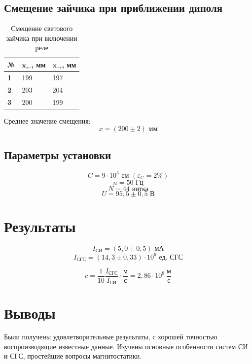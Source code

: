 \documentclass[a4paper, 12pt]{article}
\begin{document}
\subsection*{Смещение зайчика при приближении диполя}

\begin{table}[H]
\centering
\begin{tabular}{|l|l|l|}
\hline
\textbf{№}          & \textbf{$\mathbf{x_\leftarrow}$, мм} & \textbf{$\mathbf{x_\rightarrow}$, мм} \\ \hline
\textbf{1} & 199                         & 197                          \\ \hline
\textbf{2} & 203                         & 204                          \\ \hline
\textbf{3} & 200                         & 199                          \\ \hline
\end{tabular}
\caption{Смещение светового зайчика при включении реле}
\end{table}

Среднее значение смещения:
$$x = (200\pm2) \text{ мм}$$
\subsection*{Параметры установки}
$$C=9\cdot 10^5 \text{ см } (\varepsilon_C = 2\%)$$
$$n = 50 \text{ Гц}$$
$$N = 44 \text{ витка}$$
$$U=95,5\pm 0,5 \text{ В}$$

\section*{Результаты}
$$I_\text{СИ} = (5,0\pm0,5) \text{ мА}$$
$$I_\text{СГС}= (14,3\pm0,33)\cdot10^{6} \text{ ед. СГС}$$

$$c=\frac{1}{10}\frac{I_\text{СГС}}{I_\text{СИ}}\cdot\frac{\text{м}}{\text{с}} = 2,86\cdot 10^8\ \frac{\text{м}}{\text{с}}$$

\section*{Выводы}
Были получены удовлетворительные результаты, с хорошей точностью воспроизводящие известные данные. Изучены основные особенности систем СИ и СГС, простейшие вопросы магнитостатики.
\end{document}

